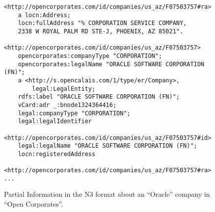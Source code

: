 \documentclass{llncs}
\begin{document}
\begin{itemize}
\begin{figure}[!h]
\begin{center}
\begin{lstlisting}[language=SPARQL]
<http://opencorporates.com/id/companies/us_az/F07503757#ra> 
	a locn:Address;
	locn:fullAddress "% CORPORATION SERVICE COMPANY, 
	2338 W ROYAL PALM RD STE-J, PHOENIX, AZ 85021".

<http://opencorporates.com/id/companies/us_az/F07503757> 
	opencorporates:companyType "CORPORATION";
	opencorporates:legalName "ORACLE SOFTWARE CORPORATION (FN)";
	a <http://s.opencalais.com/1/type/er/Company>,
		legal:LegalEntity;
	rdfs:label "ORACLE SOFTWARE CORPORATION (FN)";
	vCard:adr _:bnode1324364416;
	legal:companyType "CORPORATION";
	legal:legalIdentifier 
	  <http://opencorporates.com/id/companies/us_az/F07503757#id>;
	legal:legalName "ORACLE SOFTWARE CORPORATION (FN)";
	locn:registeredAddress 
	  <http://opencorporates.com/id/companies/us_az/F07503757#ra>.
...
\end{lstlisting}
\caption{Partial Information in the N3 format about an ``Oracle'' company in ``Open Corporates''.}
\label{figure:open}
\end{center}
\end{figure}
 
 
\end{itemize}


 
% 
% 
\end{document}

